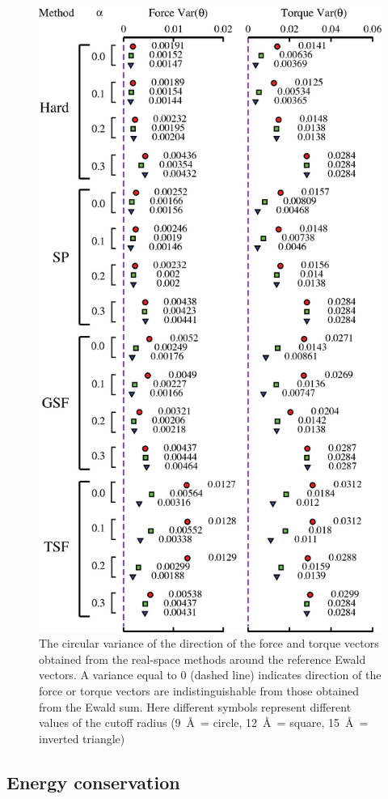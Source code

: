 \begin{figure}
  \centering
  \includegraphics[width=0.65\linewidth]{Variance_forceNtorque_modified.eps}
  \caption{The circular variance of the direction of the force and
    torque vectors obtained from the real-space methods around the
    reference Ewald vectors. A variance equal to 0 (dashed line)
    indicates direction of the force or torque vectors are
    indistinguishable from those obtained from the Ewald sum. Here
    different symbols represent different values of the cutoff radius
    (9~\AA\ = circle, 12~\AA\ = square, 15~\AA\ = inverted triangle)\label{fig:slopeCorr_circularVariance}}
\end{figure}

\subsection{Energy conservation\label{sec:conservation}}

